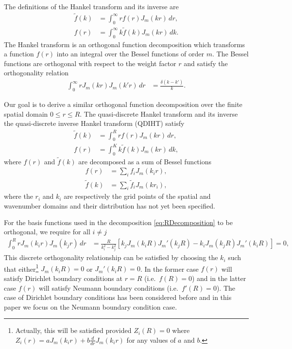 \documentclass[aip,amsmath,amssymb,reprint,twocolumn]{revtex4-1}
\begin{document}
The definitions of the Hankel transform and its inverse are
\begin{align}
  \tilde{f}(k) &= \int_0^\infty r f(r) J_{m}(k r)\, dr, \\
  f(r) &= \int_0^\infty k \tilde{f}(k) J_{m}(k r)\, dk. 
\end{align}
The Hankel transform is an orthogonal function decomposition which transforms a function $f(r)$ into an integral over the Bessel functions of order $m$. The Bessel functions are orthogonal with respect to the weight factor $r$ and satisfy the orthogonality relation
\begin{align}
  \int_0^\infty r J_m(k r) J_m(k' r) \,dr &= \frac{\delta(k - k')}{k}.
\end{align}

Our goal is to derive a similar orthogonal function decomposition over the finite spatial domain $0 \leq r \leq R$.  The quasi-discrete Hankel transform and its inverse the quasi-discrete inverse Hankel transform (QDIHT) satisfy
\begin{align}
  \tilde{f}(k) &= \int_0^R r f(r) J_{m}(k r)\, dr,  \label{eq:QDHT} \\
  f(r) &= \int_0^K k \tilde{f}(k) J_{m}(k r)\, dk,  \label{eq:QDIHT}
\end{align}
where $f(r)$ and $\tilde{f}(k)$ are decomposed as a sum of Bessel functions
\begin{align}
  f(r) &= \sum_i f_i J_m(k_i r),  \label{eq:RDecomposition} \\
  \tilde{f}(k) &= \sum_i \tilde{f}_i J_m(k r_i), \label{eq:KDecomposition}
\end{align}
where the $r_i$ and $k_i$ are respectively the grid points of the spatial and wavenumber domains and their distribution has not yet been specified.

\begin{widetext}
For the basis functions used in the decomposition \eqref{eq:RDecomposition} to be orthogonal, we require for all $i \neq j$
\begin{align}
  \int_0^{R} r J_m(k_i r) J_m(k_j r)\, dr &= \frac{R}{k_i^2-k_j^2} \left[k_j J_m(k_i R) J_m'(k_j R) - k_i J_m(k_j R) J_m'(k_i R)\right] = 0, \label{eq:DiscreteROrthogonality}
\end{align}
This discrete orthogonality relationship can be satisfied by choosing the $k_i$ such that either\footnote{Actually, this will be satisfied provided $Z_i(R)=0$ where $Z_i(r) = a J_m(k_i r) + b \frac{d}{dr} J_m(k_i r)$ for any values of $a$ and $b$.} $J_m(k_i R) = 0$ or $J_m'(k_i R) = 0$.  In the former case $f(r)$ will satisfy Dirichlet boundary conditions at $r=R$ (i.e.\ $f(R) = 0$) and in the latter case $f(r)$ will satisfy Neumann boundary conditions (i.e.\ $f'(R) = 0$).  The case of Dirichlet boundary conditions has been considered before \citep{Yu:1998,Guizar-Sicairos:2004} and in this paper we focus on the Neumann boundary condition case.
\end{widetext}
\end{document}
